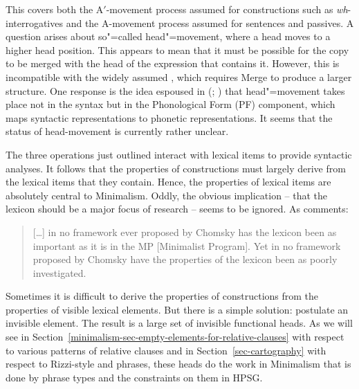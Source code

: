 \documentclass[output=paper,biblatex,babelshorthands,newtxmath,draftmode,colorlinks,citecolor=brown]{langscibook}
\begin{document}
This covers both the A$'$-movement process assumed for  constructions
such as \emph{wh}-interrogatives and the A-movement process assumed for  sentences and
passives. A question arises about so"=called head"=movement, where a head moves to a higher head
position. This appears to mean that it must be possible for the copy to be merged with the head of
the expression that contains it. However, this is incompatible with the widely assumed , which requires Merge to produce a larger structure. One response is the idea espoused in
\citeauthor{Chomsky95b-u} (\citeyear[368]{Chomsky95b-u}; \citeyear[37]{Chomsky2001a-u}) that
head"=movement takes place not in the syntax but in the Phonological Form (PF) component, which maps syntactic
representations to phonetic representations. It seems that the status of head-movement is currently rather unclear.

The three operations just outlined interact with lexical items to provide syntactic analyses. It follows that the properties of constructions must largely derive from the lexical items that they contain. Hence, the properties of lexical items are absolutely central to Minimalism. Oddly, the obvious implication – that the lexicon should be a major focus of research – seems to be ignored. As \citet[95, fn.\,9]{Newmeyer2005a} comments:
\begin{quote}
[\ldots] in no framework ever proposed by Chomsky has the lexicon been as important as it is in the
MP [Minimalist Program]. Yet in no framework proposed by Chomsky have the properties of the lexicon
been as poorly investigated. \citep[95, fn.\,9]{Newmeyer2005a}
\end{quote}
\largerpage
Sometimes it is difficult to derive the properties of constructions from the properties of visible
lexical elements. But there is a simple solution: postulate an invisible element. The result is a
large set of invisible functional heads. As we will see in
Section~\ref{minimalism-sec-empty-elements-for-relative-clauses} with respect to various patterns of
  relative clauses and in Section~\ref{sec-cartography} with respect to Rizzi-style  and 
  phrases, these heads do the work in Minimalism that is done by phrase types and the constraints
on them in HPSG.  
\end{document}
